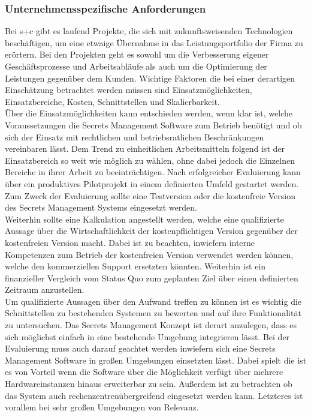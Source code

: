 \documentclass[
book,
a4paper,   
titlepage,  
halfparskip,
12pt        
]{scrartcl}
\begin{document}
\begin{onehalfspacing}
\subsubsection{Unternehmensspezifische Anforderungen}
Bei s+c gibt es laufend Projekte, die sich mit zukunftsweisenden Technologien beschäftigen, um eine etwaige Übernahme in das Leistungsportfolio der Firma zu erörtern. Bei den Projekten geht es sowohl um die Verbesserung eigener Geschäftsprozesse und Arbeitsabläufe als auch um die Optimierung der Leistungen gegenüber dem Kunden. Wichtige Faktoren die bei einer derartigen Einschätzung betrachtet werden müssen sind Einsatzmöglichkeiten, Einsatzbereiche, Kosten, Schnittstellen und Skalierbarkeit. \\                                                                                                                                                                                                                                                                                                                                                                                                                     
Über die Einsatzmöglichkeiten kann entschieden werden, wenn klar ist, welche Voraussetzungen die Secrets Management Software zum Betrieb benötigt und ob sich der Einsatz mit rechtlichen und betriebsratlichen Beschränkungen vereinbaren lässt. Dem Trend zu einheitlichen Arbeitsmitteln folgend ist der Einsatzbereich so weit wie möglich zu wählen, ohne dabei jedoch die Einzelnen Bereiche in ihrer Arbeit zu beeinträchtigen. Nach erfolgreicher Evaluierung kann über ein produktives Pilotprojekt in einem definierten Umfeld gestartet werden. Zum Zweck der Evaluierung sollte eine Testversion oder die kostenfreie Version des Secrets Management Systems eingesetzt werden.\\
Weiterhin sollte eine Kalkulation angestellt werden, welche eine qualifizierte Aussage über die Wirtschaftlichkeit der kostenpflichtigen Version gegenüber der kostenfreien Version macht. Dabei ist zu beachten,  inwiefern interne Kompetenzen zum Betrieb der kostenfreien Version verwendet werden können, welche den kommerziellen Support ersetzten könnten. Weiterhin ist ein finanzieller Vergleich vom Status Quo zum geplanten Ziel über einen definierten Zeitraum anzustellen.\\ 
Um qualifizierte Aussagen über den Aufwand treffen zu können ist es wichtig die Schnittstellen zu bestehenden Systemen zu bewerten und auf ihre Funktionalität zu untersuchen. Das Secrets Management Konzept ist derart anzulegen, dass es sich möglichst einfach in eine bestehende Umgebung integrieren lässt. Bei der Evaluierung muss auch darauf geachtet werden inwiefern sich eine Secrets Management Software in großen Umgebungen einsetzten lässt. Dabei spielt die ist es von Vorteil wenn die Software über die Möglichkeit verfügt über mehrere Hardwareinstanzen hinaus erweiterbar zu sein. Außerdem ist zu betrachten ob das System auch rechenzentrenübergreifend eingesetzt werden kann. Letzteres ist vorallem bei sehr großen Umgebungen von Relevanz.


\end{onehalfspacing}
\end{document}
